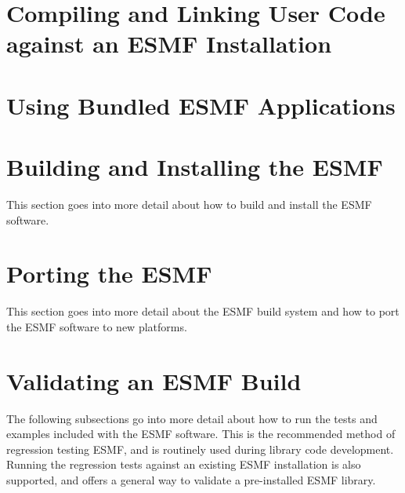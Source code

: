 
\section{Compiling and Linking User Code against an ESMF Installation}
\label{sec:Use}


\newpage

\section{Using Bundled ESMF Applications}
\label{sec:Apps}


\newpage

\section{Building and Installing the ESMF}
\label{sec:TechOver}

This section goes into more detail about how to build and install the ESMF
software.




\section{Porting the ESMF}
\label{sec:TechOverPort}

This section goes into more detail about the ESMF build system and how to
port the ESMF software to new platforms.




\section{Validating an ESMF Build}
\label{sec:TechOver2}

The following subsections go into more detail about how to run the tests and
examples included with the ESMF software. This is the recommended method of
regression testing ESMF, and is routinely used during library code development.
Running the regression tests against an existing ESMF installation is also 
supported, and offers a general way to validate a pre-installed ESMF library.





